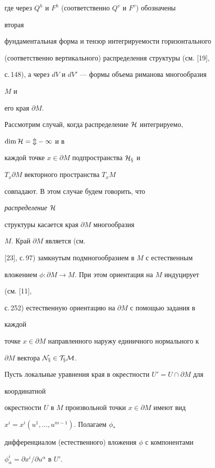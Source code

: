 где через $Q^h$ и $F^h$ (соответственно $Q^v$ и $F^v$) обозначены 


вторая 


фундаментальная форма и тензор интегрируемости горизонтального 


(соответственно вертикального) распределения структуры (см. [19], 


с.\,148), а через $dV$ и $dV'$ --- формы объема риманова многообразия 


$M$ и 


его края $\partial M$. 


 


Рассмотрим случай, когда распределение $\cal H$ интегрируемо, 


$\dim\cal H=m-1$ и в 


каждой точке $x\in\partial M$ подпространства $\cal H_x$ и 


$T_x\partial M$ векторного пространства $T_x M$ 


совпадают. В этом случае будем говорить, что {\it распределение $\cal 


H$ 


структуры касается края $\partial M$ многообразия} $M$. Край $\partial 


M$ является (см. 


[23], с.\,97) замкнутым подмногообразием в $M$ с естественным 


вложением $\phi:\partial M\to M$. При этом ориентация на $M$ индуцирует 


(см. [11], 


с.\,252) естественную ориентацию на $\partial M$ с помощью задания в 


каждой 


точке $x\in\partial M$ направленного наружу единичного нормального к 


$\partial M$ вектора $\cal N_x\in T_x M$. 


 


Пусть локальные уравнения края в окрестности $U'=U\cap \partial M$ для 


координатной 


окрестности $U$ в $M$ произвольной точки $x\in\partial M$ имеют вид 


$x^i=x^i(u^1,\dotsc,u^{m-1})$. Полагаем $\phi_*$ 


дифференциалом (естественного) вложения $\phi$ с компонентами 


$\phi^i_\alpha=\partial x^i/\partial u^\alpha$ в $U'$. 


